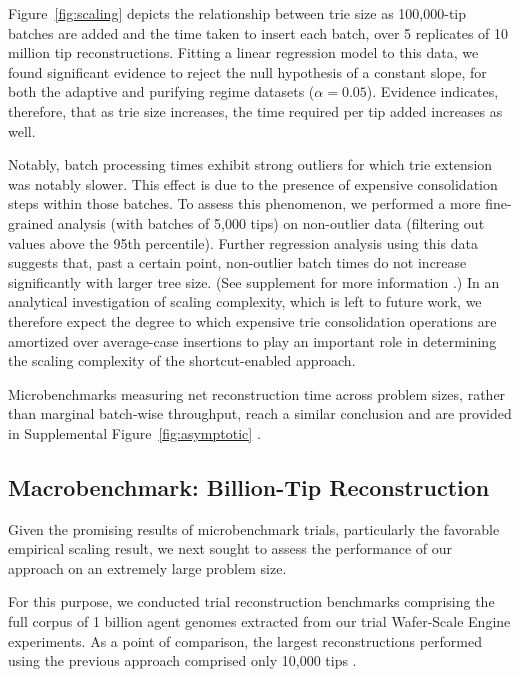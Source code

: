 Figure~\ref{fig:scaling} depicts the relationship between trie size as 100,000-tip batches are added and the time taken to insert each batch, over 5 replicates of 10 million tip reconstructions.
Fitting a linear regression model to this data, we found significant evidence to reject the null hypothesis of a constant slope, for both the adaptive and purifying regime datasets ($\alpha = 0.05$).
Evidence indicates, therefore, that as trie size increases, the time required per tip added increases as well.

Notably, batch processing times exhibit strong outliers for which trie extension was notably slower.
This effect is due to the presence of expensive consolidation steps within those batches.
To assess this phenomenon, we performed a more fine-grained analysis (with batches of 5,000 tips) on non-outlier data (filtering out values above the 95th percentile).
Further regression analysis using this data suggests that, past a certain point, non-outlier batch times do not increase significantly with larger tree size.
(See supplement for more information \citep{supplemental}.)
In an analytical investigation of scaling complexity, which is left to future work, we therefore expect the degree to which expensive trie consolidation operations are amortized over average-case insertions to play an important role in determining the scaling complexity of the shortcut-enabled approach.

Microbenchmarks measuring net reconstruction time across problem sizes, rather than marginal batch-wise throughput, reach a similar conclusion and are provided in Supplemental Figure~\ref{fig:asymptotic} \citep{supplemental}.

\subsection{Macrobenchmark: Billion-Tip Reconstruction}



Given the promising results of microbenchmark trials, particularly the favorable empirical scaling result, we next sought to assess the performance of our approach on an extremely large problem size.

For this purpose, we conducted trial reconstruction benchmarks comprising the full corpus of 1 billion agent genomes extracted from our trial Wafer-Scale Engine experiments.
As a point of comparison, the largest reconstructions performed using the previous approach comprised only 10,000 tips \citep{moreno2024trackable}.

